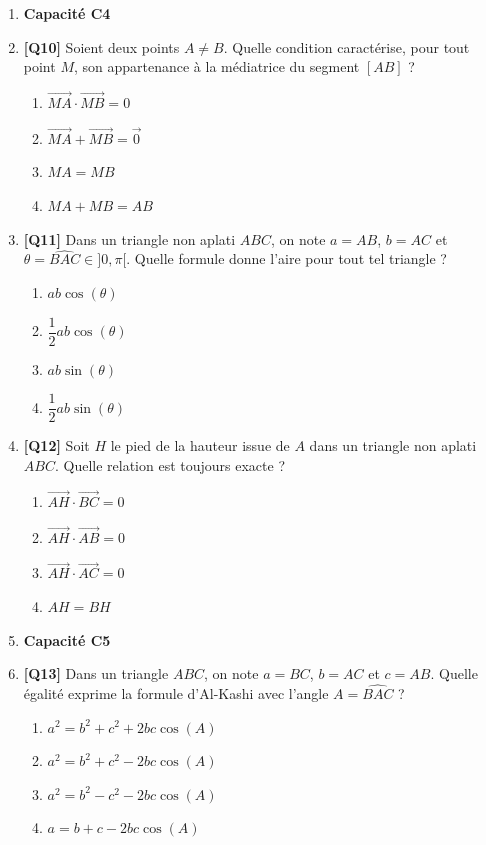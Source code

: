\begin{enumerate}
\item[] \textbf{Capacité C4}

\item \textbf{[Q10]} Soient deux points $A\neq B$. Quelle condition caractérise, pour tout point $M$, son appartenance à la médiatrice du segment $[AB]$ ?
  \begin{enumerate}[label=\Alph*.]
    \item $\vec{MA} \cdot \vec{MB} = 0$
    \item $\vec{MA} + \vec{MB} = \vec{0}$
    \item $MA = MB$
    \item $MA + MB = AB$
  \end{enumerate}

\item \textbf{[Q11]} Dans un triangle non aplati $ABC$, on note $a=AB$, $b=AC$ et $\theta=\widehat{BAC}\in]0,\pi[$. Quelle formule donne l'aire pour tout tel triangle ?
  \begin{enumerate}[label=\Alph*.]
    \item $ab \cos(\theta)$
    \item $\dfrac{1}{2} ab \cos(\theta)$
    \item $ab \sin(\theta)$
    \item $\dfrac{1}{2} ab \sin(\theta)$
  \end{enumerate}

\item \textbf{[Q12]} Soit $H$ le pied de la hauteur issue de $A$ dans un triangle non aplati $ABC$. Quelle relation est toujours exacte ?
  \begin{enumerate}[label=\Alph*.]
    \item $\vec{AH} \cdot \vec{BC} = 0$
    \item $\vec{AH} \cdot \vec{AB} = 0$
    \item $\vec{AH} \cdot \vec{AC} = 0$
    \item $AH = BH$
  \end{enumerate}

\item[] \textbf{Capacité C5}

\item \textbf{[Q13]} Dans un triangle $ABC$, on note $a=BC$, $b=AC$ et $c=AB$. Quelle égalité exprime la formule d'Al-Kashi avec l'angle $A=\widehat{BAC}$ ?
  \begin{enumerate}[label=\Alph*.]
    \item $a^2 = b^2 + c^2 + 2bc \cos(A)$
    \item $a^2 = b^2 + c^2 - 2bc \cos(A)$
    \item $a^2 = b^2 - c^2 - 2bc \cos(A)$
    \item $a = b + c - 2bc \cos(A)$
  \end{enumerate}


\end{enumerate}
